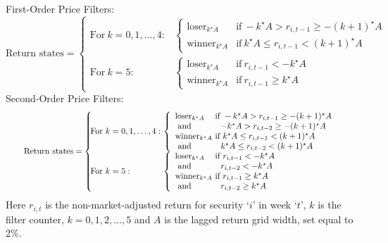 \noindent First-Order Price Filters: \twomedskip
\begin{equation*} \label{eqn:firstorder} 
	\textrm{Return states} = \left\{ 
		\begin{array}{ll}
	\!\!\!\!\textrm{For} ~k = 0,1,\ldots,4:& \!\!\!\! \left\{ 
		\begin{array}{ll}\textrm{loser}_{k^\star A} & \!\!\!\! \textrm{if}~ -k^\star A>r_{i,t-1}\geq - (k+1)^\star A \\
		 \textrm{winner}_{k^\star A}&\!\!\!\!\textrm{if}~ k^\star A\leq r_{i,t-1} <  (k+1)^\star A
		 \end{array} \right.\\
	\!\!\!\!\textrm{For}~ k = 5:& \!\!\!\!\left\{ 
		 \begin{array}{ll}\textrm{loser}_{k^\star A} & \!\!\!\!\textrm{if}~ r_{i,t-1} <-k^\star A \\ 
		 \textrm{winner}_{k^\star A} & \!\!\!\!\textrm{if}~  r_{i,t-1} \geq  k^\star A
		 \end{array}\right.
		\end{array} 
		\right. 
	\end{equation*} \twomedskip
\noindent Second-Order Price Filters: \twomedskip
	\begin{equation} \label{eqn:secondorder} 
\scalebox{0.85}{$
	\textrm{Return states} =\left\{ 
		\begin{array}{ll}
		\!\!\!\!\textrm{For} ~k = 0,1,\ldots,4: & \!\!\!\! \left\{ 
			\begin{array}{ll}
			\textrm{loser}_{k^\star A} & \!\!\!\!\textrm{if}~ -k^\star A>r_{i,t-1}\geq - (k+1)^\star A \\ 
			\textrm{     and} & -k^\star A > r_{i,t-2} \geq -(k+1)^\star A \\
			\textrm{winner}_{k^\star A} & \!\!\!\!\textrm{if} ~k^\star A\leq r_{i,t-1} <  (k+1)^\star A \\ 
			\textrm{     and} & k^\star A \leq r_{i,t-2} < (k+1)^\star A
			\end{array}\right.\\
		\!\!\!\!\textrm{For} ~k = 5:& \!\!\!\!\left\{ 
		\begin{array}{ll}
		\textrm{loser}_{k^\star A} & \!\!\!\!\textrm{if}~ r_{i,t-1} <-k^\star A \\ 
		\textrm{     and}  & r_{i,t-2} <-k^\star A \\
		\textrm{winner}_{k^\star A} & \!\!\!\!\textrm{if}~  r_{i,t-1} \geq  k^\star A \\ 
		\textrm{     and} & r_{i,t-2} \geq k^\star A 
		\end{array}\right.
\end{array} \right. $}
	\end{equation} 
Here $r_{i,t}$ is the non-market-adjusted return for security `$i$' in week `$t$',  $k$ is the filter counter, $k=0,1,2,\ldots,5$ and $A$ is the lagged return grid width,  set equal to 2\%. 


